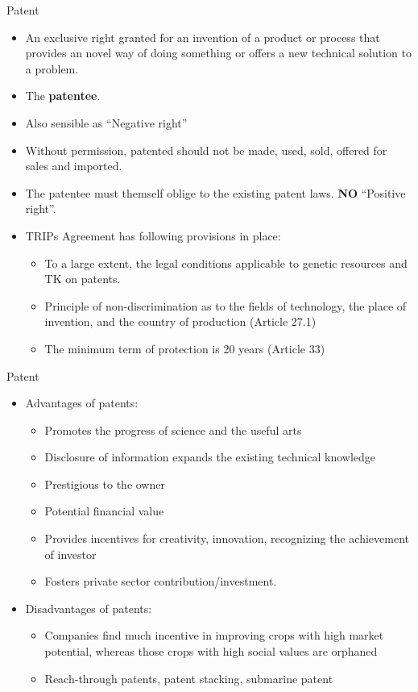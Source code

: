 \documentclass[
  ignorenonframetext,
  aspectratio=169]{beamer}
\providecommand{\tightlist}{%
  \setlength{\itemsep}{0pt}\setlength{\parskip}{0pt}}
\begin{document}
\begin{frame}{Patent}
\protect\hypertarget{patent}{}
\begin{itemize}
\tightlist
\item
  An exclusive right granted for an invention of a product or process
  that provides an novel way of doing something or offers a new
  technical solution to a problem.
\item
  The \textbf{patentee}.
\item
  Also sensible as ``Negative right''
\item
  Without permission, patented should not be made, used, sold, offered
  for sales and imported.
\item
  The patentee must themself oblige to the existing patent laws.
  \textbf{NO} ``Positive right''.
\item
  TRIPs Agreement has following provisions in place:

  \begin{itemize}
  \tightlist
  \item
    To a large extent, the legal conditions applicable to genetic
    resources and TK on patents.
  \item
    Principle of non-discrimination as to the fields of technology, the
    place of invention, and the country of production (Article 27.1)
  \item
    The minimum term of protection is 20 years (Article 33)
  \end{itemize}
\end{itemize}
\end{frame}

\begin{frame}{Patent}
\protect\hypertarget{patent-1}{}
\begin{itemize}
\tightlist
\item
  Advantages of patents:

  \begin{itemize}
  \tightlist
  \item
    Promotes the progress of science and the useful arts
  \item
    Disclosure of information expands the existing technical knowledge
  \item
    Prestigious to the owner
  \item
    Potential financial value
  \item
    Provides incentives for creativity, innovation, recognizing the
    achievement of investor
  \item
    Fosters private sector contribution/investment.
  \end{itemize}
\item
  Disadvantages of patents:

  \begin{itemize}
  \tightlist
  \item
    Companies find much incentive in improving crops with high market
    potential, whereas those crops with high social values are orphaned
  \item
    Reach-through patents, patent stacking, submarine patent
  \end{itemize}
\end{itemize}
\end{frame}
\end{document}
